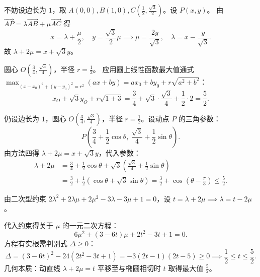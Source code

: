 \documentclass[11pt,a4paper,openany]{ctexbook}
\newcommand{\vect}[1]{\overrightarrow{#1}}
\begin{document}
\begin{solution}
\vspace{0.4em}
\begin{methodbox}[title={方法四：直角坐标系与圆上线性函数公式}]
不妨设边长为 \(1\)，取 \(A(0,0), B(1,0), C\left(\frac{1}{2}, \frac{\sqrt{3}}{2}\right)\)。设 \(P(x,y)\)。
由 \(\vect{AP} = \lambda\vect{AB} + \mu\vect{AC}\) 得
\[
x = \lambda + \frac{\mu}{2},\quad y = \frac{\sqrt{3}}{2}\mu
\implies
\mu = \frac{2y}{\sqrt{3}},\quad \lambda = x - \frac{y}{\sqrt{3}}.
\]
故 \(\lambda+2\mu = x + \sqrt{3}y\)。

圆心 \(O\left(\frac{3}{4}, \frac{\sqrt{3}}{4}\right)\)，半径 \(r=\frac{1}{2}\)。
应用圆上线性函数最大值通式 \(\max_{(x-x_0)^2+(y-y_0)^2=r^2}(ax+by) = ax_0+by_0+r\sqrt{a^2+b^2}\)：
\[
x_O + \sqrt{3}y_O + r\sqrt{1+3} = \frac{3}{4} + \sqrt{3}\cdot\frac{\sqrt{3}}{4} + \frac{1}{2}\cdot 2 = \frac{5}{2}.
\]
\end{methodbox}

\vspace{0.4em}
\begin{methodbox}[title={方法五：直角坐标与三角参数法}]
仍设边长为 \(1\)，圆心 \(O\left(\frac{3}{4}, \frac{\sqrt{3}}{4}\right)\)，半径 \(r=\frac{1}{2}\)。设动点 \(P\) 的三角参数：
\[
P\left(\frac{3}{4} + \frac{1}{2}\cos\theta,\ \frac{\sqrt{3}}{4} + \frac{1}{2}\sin\theta\right).
\]
由方法四得 \(\lambda+2\mu = x+\sqrt{3}y\)，代入参数：
\[
\begin{aligned}
\lambda+2\mu &= \frac{3}{4} + \frac{1}{2}\cos\theta + \sqrt{3}\left(\frac{\sqrt{3}}{4} + \frac{1}{2}\sin\theta\right)\\[0.3em]
&= \frac{3}{2} + \frac{1}{2}(\cos\theta + \sqrt{3}\sin\theta) = \frac{3}{2} + \cos\left(\theta - \frac{\pi}{3}\right) \le \frac{5}{2}.
\end{aligned}
\]
\end{methodbox}

\vspace{0.4em}
\begin{methodbox}[title={方法六：判别式法（把目标看作动直线）}]
由二次型约束 \(2\lambda^2+2\lambda\mu+2\mu^2-3\lambda-3\mu+1=0\)，设 \(t=\lambda+2\mu \implies \lambda=t-2\mu\)。

代入约束得关于 \(\mu\) 的一元二次方程：
\[
6\mu^2 + (3-6t)\mu + 2t^2 - 3t + 1 = 0.
\]
方程有实根需判别式 \(\Delta \ge 0\)：
\[
\Delta = (3-6t)^2 - 24(2t^2-3t+1) = -3(2t-1)(2t-5) \ge 0 \implies \frac{1}{2} \le t \le \frac{5}{2}.
\]
几何本质：动直线 \(\lambda+2\mu=t\) 平移至与椭圆相切时 \(t\) 取得最大值 \(\frac{5}{2}\)。
\end{methodbox}


\end{solution}
\end{document}
